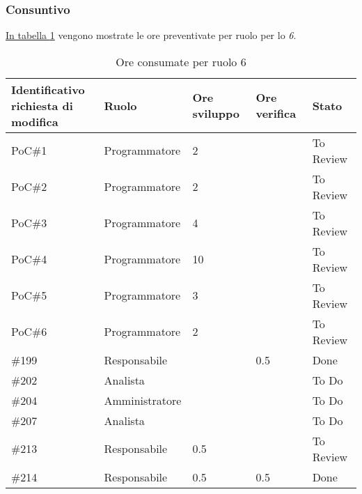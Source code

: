 \subsubsection{Consuntivo}
\hyperref[tab:sprint6_ore_consumate]{In tabella \ref{tab:sprint6_ore_consumate}} vengono mostrate le ore preventivate per ruolo per lo \textit{ 6}.

\begin{table}[H]
    \centering
    \begin{tabular}{| l | l | l | l | l |}
        \hline
            \makecell{\textbf{Identificativo} \\ \textbf{richiesta di modifica}} &
            \textbf{Ruolo} & 
            \textbf{Ore sviluppo} &
            \textbf{Ore verifica} & 
            \textbf{Stato}\\ 
        \hline
        PoC\#1 & Programmatore & 2 &  & To Review\\
        \hline
        PoC\#2 & Programmatore & 2 &  & To Review\\
        \hline
        PoC\#3 & Programmatore & 4 &  & To Review\\
        \hline
        PoC\#4 & Programmatore & 10 &  & To Review\\
        \hline
        PoC\#5 & Programmatore & 3 &  & To Review\\
        \hline
        PoC\#6 & Programmatore & 2 &  & To Review\\
        \hline
        \#199 & Responsabile &  & 0.5 & Done\\
        \hline
        \#202 & Analista &  &  & To Do\\
        \hline
        \#204 & Amministratore &  &  & To Do\\
        \hline
        \#207 & Analista &  &  & To Do\\
        \hline
        \#213 & Responsabile & 0.5 &  & To Review\\
        \hline
        \#214 & Responsabile & 0.5 & 0.5 & Done\\
        \hline
    \end{tabular}
    \caption{Ore consumate per ruolo  6}
    \label{tab:sprint6_ore_consumate} 
\end{table}